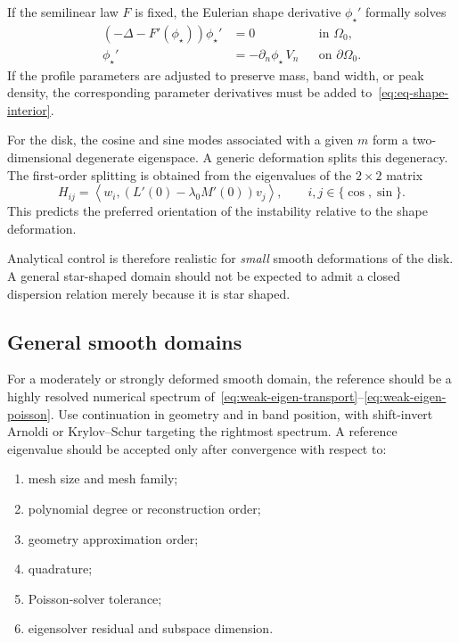 \documentclass[11pt,a4paper]{article}
\newcommand{\Om}{\Omega}
\newcommand{\ip}[2]{\left\langle #1,#2\right\rangle}
\begin{document}
If the semilinear law $F$ is fixed, the Eulerian shape derivative $\phi_\star'$ formally solves
\begin{align}
  \left(-\Delta-F'(\phi_\star)\right)\phi_\star'&=0
  &&\text{in }\Om_0, \label{eq:eq-shape-interior}\\
  \phi_\star'&=-\partial_n\phi_\star\,V_n
  &&\text{on }\partial\Om_0. \label{eq:eq-shape-boundary}
\end{align}
If the profile parameters are adjusted to preserve mass, band width, or peak density, the corresponding parameter derivatives must be added to~\eqref{eq:eq-shape-interior}.

For the disk, the cosine and sine modes associated with a given $m$ form a two-dimensional degenerate eigenspace. A generic deformation splits this degeneracy. The first-order splitting is obtained from the eigenvalues of the $2\times2$ matrix
\begin{equation}
  H_{ij}
  =\ip{w_i}{\left(L'(0)-\lambda_0M'(0)\right)v_j},
  \qquad i,j\in\{\cos,\sin\}.
  \label{eq:degenerate-splitting}
\end{equation}
This predicts the preferred orientation of the instability relative to the shape deformation.

Analytical control is therefore realistic for \emph{small} smooth deformations of the disk. A general star-shaped domain should not be expected to admit a closed dispersion relation merely because it is star shaped.

\subsection{General smooth domains}

For a moderately or strongly deformed smooth domain, the reference should be a highly resolved numerical spectrum of~\eqref{eq:weak-eigen-transport}--\eqref{eq:weak-eigen-poisson}. Use continuation in geometry and in band position, with shift-invert Arnoldi or Krylov--Schur targeting the rightmost spectrum. A reference eigenvalue should be accepted only after convergence with respect to:
\begin{enumerate}
  \item mesh size and mesh family;
  \item polynomial degree or reconstruction order;
  \item geometry approximation order;
  \item quadrature;
  \item Poisson-solver tolerance;
  \item eigensolver residual and subspace dimension.
\end{enumerate}
\end{document}
